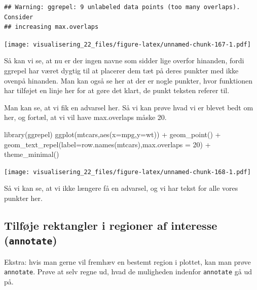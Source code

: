 \documentclass[
]{book}
\newenvironment{Shaded}{\begin{snugshade}}{\end{snugshade}}
\newcommand{\AttributeTok}[1]{\textcolor[rgb]{0.77,0.63,0.00}{#1}}
\newcommand{\DecValTok}[1]{\textcolor[rgb]{0.00,0.00,0.81}{#1}}
\newcommand{\FunctionTok}[1]{\textcolor[rgb]{0.00,0.00,0.00}{#1}}
\newcommand{\NormalTok}[1]{#1}
\newcommand{\SpecialCharTok}[1]{\textcolor[rgb]{0.00,0.00,0.00}{#1}}
\begin{document}
\begin{verbatim}
## Warning: ggrepel: 9 unlabeled data points (too many overlaps). Consider
## increasing max.overlaps
\end{verbatim}

\texttt{[image: visualisering\_22\_files/figure-latex/unnamed-chunk-167-1.pdf]}

Så kan vi se, at nu er der ingen navne som sidder lige overfor hinanden, fordi ggrepel har været dygtig til at placerer dem tæt på deres punkter med ikke ovenpå hinanden. Man kan også se her at der er nogle punkter, hvor funktionen har tilføjet en linje her for at gøre det klart, de punkt teksten referer til.

Man kan se, at vi fik en advarsel her. Så vi kan prøve hvad vi er blevet bedt om her, og fortæl, at vi vil have max.overlaps måske 20.

\begin{Shaded}
\begin{Highlighting}[]
\FunctionTok{library}\NormalTok{(ggrepel)}
\FunctionTok{ggplot}\NormalTok{(mtcars,}\FunctionTok{aes}\NormalTok{(}\AttributeTok{x=}\NormalTok{mpg,}\AttributeTok{y=}\NormalTok{wt)) }\SpecialCharTok{+} 
  \FunctionTok{geom\_point}\NormalTok{() }\SpecialCharTok{+}
  \FunctionTok{geom\_text\_repel}\NormalTok{(}\AttributeTok{label=}\FunctionTok{row.names}\NormalTok{(mtcars),}\AttributeTok{max.overlaps =} \DecValTok{20}\NormalTok{) }\SpecialCharTok{+}
  \FunctionTok{theme\_minimal}\NormalTok{()}
\end{Highlighting}
\end{Shaded}

\texttt{[image: visualisering\_22\_files/figure-latex/unnamed-chunk-168-1.pdf]}

Så vi kan se, at vi ikke længere få en advarsel, og vi har tekst for alle vores punkter her.

\hypertarget{tilfuxf8je-rektangler-i-regioner-af-interesse-annotate}{%
\subsection{\texorpdfstring{Tilføje rektangler i regioner af interesse (\texttt{annotate})}{Tilføje rektangler i regioner af interesse (annotate)}}\label{tilfuxf8je-rektangler-i-regioner-af-interesse-annotate}}

Ekstra: hvis man gerne vil fremhæv en bestemt region i plottet, kan man prøve \texttt{annotate}. Prøve at selv regne ud, hvad de muligheden indenfor \texttt{annotate} gå ud på.
\end{document}
